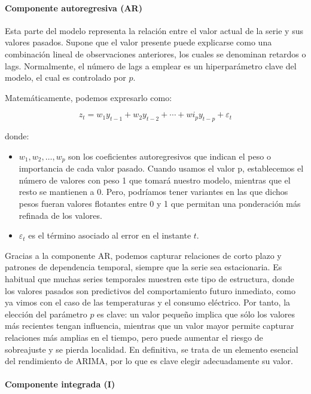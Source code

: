 \paragraph{Componente autoregresiva (AR)}
\mbox{}

Esta parte del modelo representa la relación entre el valor actual de la serie y sus valores pasados. Supone que el valor presente puede explicarse como una combinación lineal de observaciones anteriores, los cuales se denominan retardos o lags. Normalmente, el número de lags a emplear es un hiperparámetro clave del modelo, el cual es controlado por  \( p \).

	Matemáticamente, podemos expresarlo como:
	
	\[
	z_t = w_1 y_{t-1} + w_2 y_{t-2} + \cdots + wi_p y_{t-p} + \varepsilon_t
	\]
	
	donde:
	\begin{itemize}
		\item \( w_1, w_2, \ldots, w_p \) son los coeficientes autoregresivos que indican el peso o importancia de cada valor pasado. Cuando usamos el valor p, establecemos el número de valores con peso 1 que tomará nuestro modelo, mientras que el resto se mantienen a 0.  Pero, podríamos tener variantes en las que dichos pesos fueran valores flotantes entre 0 y 1 que permitan una ponderación más refinada de los valores.
		\item \( \varepsilon_t \) es el término asociado al error en el instante \( t \).
	\end{itemize}
	
	Gracias a la componente AR, podemos capturar relaciones de corto plazo y patrones de dependencia temporal, siempre que la serie sea estacionaria. Es habitual que muchas series temporales muestren este tipo de estructura, donde los valores pasados son predictivos del comportamiento futuro inmediato, como ya vimos con el caso de las temperaturas y el consumo eléctrico. Por tanto, la elección del parámetro \( p \) es clave:  un valor pequeño implica que sólo los valores más recientes tengan influencia, mientras que un valor mayor permite capturar relaciones más amplias en el tiempo, pero puede aumentar el riesgo de sobreajuste y se pierda localidad. En definitiva, se trata de un elemento esencial del rendimiento de ARIMA, por lo que es clave elegir adecuadamente su valor.

	\paragraph{Componente integrada (I)}
	\mbox{}
	
